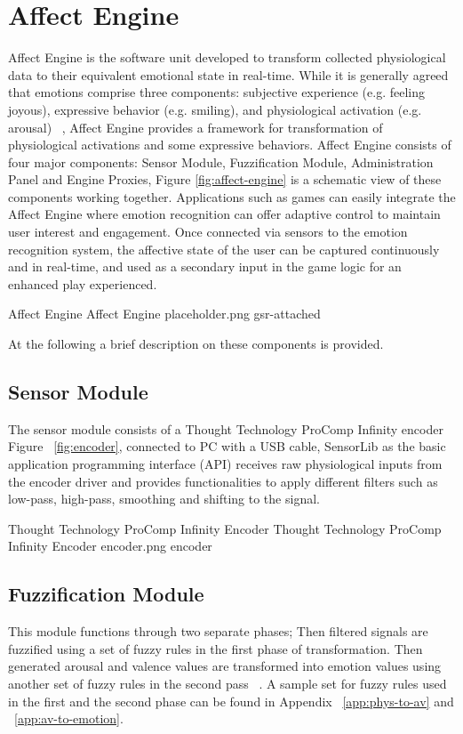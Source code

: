 \documentclass{uofsthesis-cs}
\begin{document}
\section{Affect Engine} %
Affect Engine is the software unit developed to transform collected physiological data to their equivalent emotional state in real-time. While it is generally agreed that emotions comprise three components: subjective experience (e.g. feeling joyous), expressive behavior (e.g. smiling), and physiological activation (e.g. arousal) ~\cite{scherer1993neuroscience}, Affect Engine provides a framework for transformation of physiological activations and some expressive behaviors. Affect Engine consists of four major components: Sensor Module, Fuzzification Module, Administration Panel and Engine Proxies, Figure \ref{fig:affect-engine} is a schematic view of these components working together. Applications such as games can easily integrate the Affect Engine where emotion recognition can offer adaptive control to maintain user interest and engagement. Once connected via sensors to the emotion recognition system, the affective state of the user can be captured continuously and in real-time, and used as a secondary input in the game logic for an enhanced play experienced.

\img
{Affect Engine}
{Affect Engine}
{placeholder.png}
{gsr-attached}

At the following a brief description on these components is provided.

\subsection{Sensor Module} %
The sensor module consists of a Thought Technology ProComp Infinity encoder ~\cite{tt2013procomp} Figure ~\ref{fig:encoder}, connected to PC with a USB cable, SensorLib as the basic application programming interface (API) receives raw physiological inputs from the encoder driver and provides functionalities to apply different filters such as low-pass, high-pass, smoothing and shifting to the signal.

\img
{Thought Technology ProComp Infinity Encoder}
{Thought Technology ProComp Infinity Encoder}
{encoder.png}
{encoder}

\subsection{Fuzzification Module} \label{subsec:fuzzi} %
This module functions through two separate phases; Then filtered signals are fuzzified using a set of fuzzy rules in the first phase of transformation. Then generated arousal and valence values are transformed into emotion values using another set of fuzzy rules in the second pass ~\cite{mandryk2007fuzzy}. A sample set for fuzzy rules used in the first and the second phase can be found in Appendix ~\ref{app:phys-to-av} and ~\ref{app:av-to-emotion}.
\end{document}
